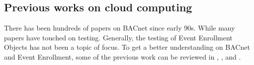 \documentclass[conference]{IEEEtran}
\newcommand{\todo}[1]{}
\renewcommand{\todo}[1]{{\color{red} TODO: {#1}}}
\begin{document}
	\subsection{Previous works on cloud computing}
	There has been hundreds of papers on BACnet since early 90s. 
	While many papers have touched on testing. Generally, the testing of Event Enrollment Objects has not been a topic of focus.
	To get a better understanding on BACnet and Event Enrollment, some of the previous work can be reviewed in \cite{bushby1997bacnettm}, \cite{bushby2002bacnet}, \cite{nussbaumerbacnet} and \cite{newman2015bacnet}. 


\end{document}

